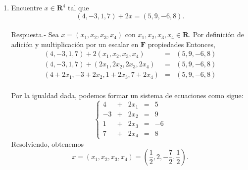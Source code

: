 \begin{enumerate}[\bfseries 1.]
    \item Encuentre $x\in \textbf{R}^4$ tal que 
    $$(4,-3,1,7)+2x=(5,9,-6,8).$$\\
	Respuesta.-\; Sea $x = (x_1,x_2,x_3,x_4)$ con $x_1,x_2,x_3,x_4\in \textbf{R}$. Por definición de adición y multiplicación por un escalar en $\textbf{F}$ propiedades  Entonces,
	$$\begin{array}{rcl}
	    (4,-3,1,7)+2(x_1,x_2,x_3,x_4)&=&(5,9,-6,8)\\
	    (4,-3,1,7)+(2x_1,2x_2,2x_3,2x_4)&=&(5,9,-6,8)\\
	    (4+2x_1,-3+2x_2,1+2x_3,7+2x_4)&=&(5,9,-6,8)\\
	\end{array}$$

	Por la igualdad dada, podemos formar un sistema de ecuaciones como sigue:
	$$\left\{\begin{array}{rcccr}
	    4&+&2x_1&=&5\\
	    -3&+&2x_2&=&9\\
	    1&+&2x_3&=&-6\\
	    7&+&2x_4&=&8	
	\end{array}\right.$$
	Resolviendo, obtenemos
	$$x=(x_1,x_2,x_3,x_4)=\left(\dfrac{1}{2},2,-\dfrac{7}{2},\dfrac{1}{2}\right).$$\\



\end{enumerate}
